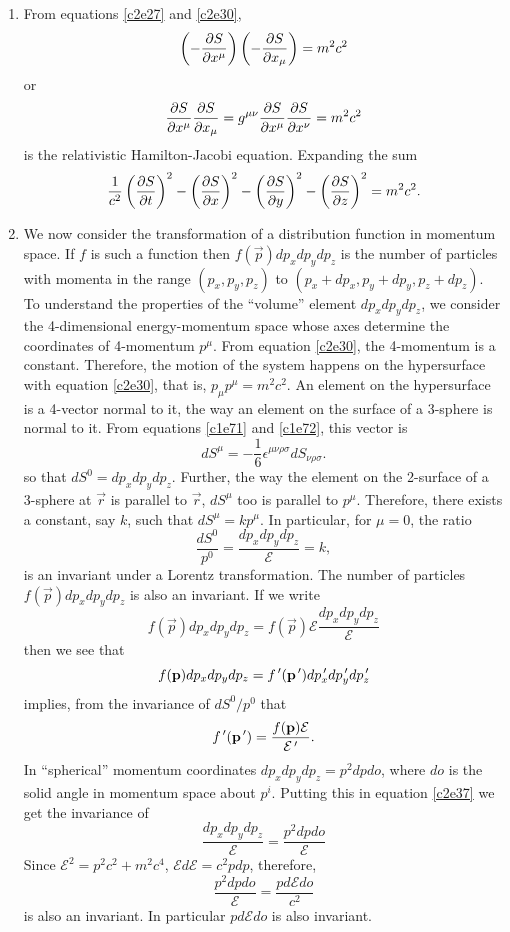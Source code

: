 \begin{enumerate}
\item From equations \eqref{c2e27} and \eqref{c2e30},
\[
\left(-\frac{\partial{S}}{\partial{x^\mu}}\right)\left(-\frac{\partial{S}}{\partial{x_\mu}}\right) = m^2c^2
\]
or
\begin{equation}\label{c2e34}
\frac{\partial{S}}{\partial{x^\mu}}\frac{\partial{S}}{\partial{x_\mu}} = g^{\mu\nu}\frac{\partial{S}}{\partial{x^\mu}}\frac{\partial{S}}{\partial{x^\nu}} = m^2c^2
\end{equation}
is the relativistic Hamilton-Jacobi equation. Expanding the sum
\begin{equation}\label{c2e35}
\frac{1}{c^2}\left(\frac{\partial{S}}{\partial{t}}\right)^2 - \left(\frac{\partial{S}}{\partial{x}}\right)^2 
- \left(\frac{\partial{S}}{\partial{y}}\right)^2 - \left(\frac{\partial{S}}{\partial{z}}\right)^2 = m^2c^2.
\end{equation}

\item We now consider the transformation of a distribution function in momentum
space. If $f$ is such a function then $f(\vec{p})dp_xdp_ydp_z$ is the number of
particles with momenta in the range $(p_x, p_y, p_z)$ to $(p_x + dp_x, p_y + dp_y,
p_z + dp_z)$. To understand the properties of the ``volume'' element $dp_xdp_ydp_z$,
we consider the 4-dimensional energy-momentum space whose axes determine the
coordinates of 4-momentum $p^\mu$. From equation \eqref{c2e30}, the 4-momentum is
a constant. Therefore, the motion of the system happens on the hypersurface with
equation \eqref{c2e30}, that is, $p_\mu p^\mu = m^2c^2$. An element on the 
hypersurface is a 4-vector normal to it, the way an element on the surface of a 
3-sphere is normal to it. From equations \eqref{c1e71} and \eqref{c1e72}, this
vector is
\begin{equation}\label{c2e36}
dS^\mu = -\frac{1}{6}\epsilon^{\mu\nu\rho\sigma}dS_{\nu\rho\sigma}.
\end{equation}
so that $dS^0 = dp_xdp_ydp_z$. Further, the way the element on the 2-surface of
a 3-sphere at $\vec{r}$ is parallel to $\vec{r}$, $dS^\mu$ too is parallel to 
$p^\mu$. Therefore, there exists a constant, say $k$, such that $dS^\mu = kp^\mu$.
In particular, for $\mu = 0$, the ratio
\begin{equation}\label{c2e37}
\frac{dS^0}{p^0} = \frac{dp_xdp_ydp_z}{\mathcal{E}} = k,
\end{equation}
is an invariant under a Lorentz transformation. The number of particles $f(\vec{p})
dp_xdp_ydp_z$ is also an invariant. If we write
\[
f(\vec{p})dp_xdp_ydp_z = f(\vec{p})\mathcal{E}\frac{dp_xdp_ydp_z}{\mathcal{E}}
\]
then we see that
\[
f(\mathbf{p})dp_xdp_ydp_z = f^{\,\prime}(\mathbf{p}^{\,\prime})dp_x^{\,\prime} dp_y^{\,\prime} dp_z^{\,\prime}
\]
implies, from the invariance of $dS^0/p^0$ that
\begin{equation}\label{c2e38}
f^{\,\prime}(\mathbf{p}^{\,\prime}) = \frac{f(\mathbf{p})\mathcal{E}}{\mathcal{E}^{\,\prime}}.
\end{equation}
In ``spherical'' momentum coordinates $dp_xdp_ydp_z = p^2dpdo$, where $do$ is the
solid angle in momentum space about $p^i$. Putting this in equation \eqref{c2e37}
we get the invariance of
\[
\frac{dp_xdp_ydp_z}{\mathcal{E}} = \frac{p^2dpdo}{\mathcal{E}} 
\]
Since $\mathcal{E}^2 = p^2c^2 + m^2c^4$, $\mathcal{E}d\mathcal{E} = c^2 pdp$, therefore,
\[
\frac{p^2dpdo}{\mathcal{E}} = \frac{pd\mathcal{E}do}{c^2}
\]
is also an invariant. In particular $pd\mathcal{E}do$ is also invariant.


\end{enumerate}
